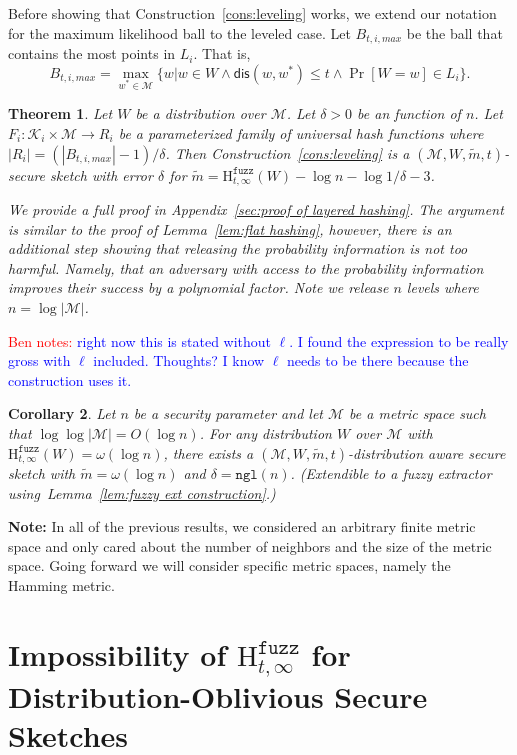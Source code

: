 \documentclass[11pt]{article}
\newcommand{\apref}[1]{\mbox{Appendix~\ref{#1}}}
\newcommand{\lemref}[1]{\mbox{Lemma~\ref{#1}}}
\newcommand{\consref}[1]{\mbox{Construction~\ref{#1}}}
\newcommand{\dis}{\ensuremath{\mathsf{dis}}}
\newcommand{\ngl}{\ensuremath{\mathtt{ngl}}\xspace}
\newcommand{\Hfuzz}{\mathrm{H}^{\mathtt{fuzz}}_{t,\infty}}
\newtheorem{theorem}{Theorem}[section]
\newtheorem{corollary}[theorem]{Corollary}
\newcommand{\authnote}[2]{{\textcolor{red}{\textsf{#1 notes: }\textcolor{blue}{ #2}}\marginpar{\textcolor{red}{\textbf{!!!!!}}}}}
\newcommand{\authnote}[2]{}
\newcommand{\bnote}[1]{{\authnote{Ben}{#1}}}
\begin{document}
\noindent Before showing that \consref{cons:leveling} works, we extend our notation for the maximum likelihood ball to the leveled case.  Let $B_{t, i, max}$ be the ball that contains the most points in $L_i$.  That is,
\[
B_{t, i, max} = \max_{w^* \in \mathcal{M}} \{w | w\in W \wedge \dis(w, w^*)\le t \wedge \Pr[W=w]\in L_i\}.
\]
\begin{theorem}
\label{thm:layered hashing}
Let $W$ be a distribution over $\mathcal{M}$.  Let $\delta>0$ be an function of $n$.  Let $F_i: \mathcal{K}_i \times \mathcal{M}\rightarrow R_i$ be a parameterized family of universal hash functions where $|R_i| = (|B_{t, i, max}|-1) /\delta$.  Then \consref{cons:leveling} is a $(\mathcal{M}, W, \tilde{m}, t)$-secure sketch with error $\delta$ for $\tilde{m} = \Hfuzz(W) - \log n - \log 1/\delta - 3$.

We provide a full proof in \apref{sec:proof of layered hashing}.  The argument is similar to the proof of \lemref{lem:flat hashing}, however, there is an additional step showing that releasing the probability information is not too harmful.  Namely, that an adversary with access to the probability information improves their success by a polynomial factor.  Note we release $n$ levels where $n =\log |\mathcal{M}|$.

\end{theorem}
\bnote{right now this is stated without $\ell$.  I found the expression to be really gross with $\ell$ included.  Thoughts?  I know $\ell$ needs to be there because the construction uses it.}

\begin{corollary}
\label{cor:extension to fuzz ext}
Let $n$ be a security parameter and let $\mathcal{M}$ be a metric space such that $\log \log |\mathcal{M}| = O(\log n)$.
For any distribution $W$ over $\mathcal{M}$ with $\Hfuzz(W)=\omega(\log n)$, there exists a $(\mathcal{M}, W, \tilde{m}, t)$-distribution aware secure sketch with $\tilde{m} = \omega(\log n)$ and $\delta = \ngl(n)$.  (Extendible to a fuzzy extractor using~\lemref{lem:fuzzy ext construction}.)
\end{corollary}

\textbf{Note:} In all of the previous results, we considered an arbitrary finite metric space and only cared about the number of neighbors and the size of the metric space.  Going forward we will consider specific metric spaces, namely the Hamming metric.
\section{Impossibility of $\Hfuzz$ for Distribution-Oblivious Secure Sketches}
\label{sec:dist oblivious}
\end{document}
